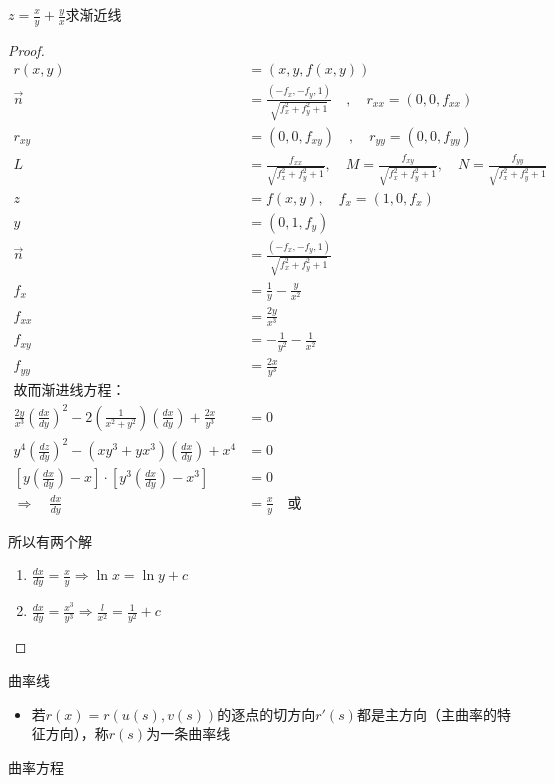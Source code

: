 \documentclass[lang=cn,10pt,thmcnt=section]{elegantbook}
\begin{document}
\begin{example}
    $z=\frac{x}{y}+\frac{y}{x}$求渐近线
\end{example}
\begin{proof}
    \begin{align*}
        r(x,y) &= (x, y, f(x,y)) \\
        \vec{n} &= \frac{(-f_x, -f_y, 1)}{\sqrt{f_x^2 + f_y^2 + 1}} \quad , \quad r_{xx} = (0, 0, f_{xx}) \\
        r_{xy} &= (0, 0, f_{xy}) \quad , \quad r_{yy} = (0, 0, f_{yy}) \\
        L &= \frac{f_{xx}}{\sqrt{f_x^2 + f_y^2 + 1}}, \quad M = \frac{f_{xy}}{\sqrt{f_x^2 + f_y^2 + 1}}, \quad N = \frac{f_{yy}}{\sqrt{f_x^2 + f_y^2 + 1}} \\   
        z &= f(x, y), \quad f_x = (1, 0, f_x) \\
        y &= (0, 1, f_y) \\
        \vec{n} &= \frac{(-f_x, -f_y, 1)}{\sqrt{f_x^2 + f_y^2 + 1}} \\
        f_x &= \frac{1}{y} - \frac{y}{x^2} \\
        f_{xx} &= \frac{2y}{x^3} \\
        f_{xy} &= -\frac{1}{y^2} - \frac{1}{x^2} \\
        f_{yy} &= \frac{2x}{y^3} \\ 
            \text{故而渐进线方程：} & \\
            \frac{2y}{x^3} \left( \frac{dx}{dy} \right)^2 
              - 2 \left( \frac{1}{x^2 + y^2} \right) \left( \frac{dx}{dy} \right) 
              + \frac{2x}{y^3} &= 0 \\
            y^4 \left( \frac{dz}{dy} \right)^2 
              - (xy^3 + yx^3) \left( \frac{dx}{dy} \right) 
              + x^4 &= 0 \\
            \left[ y \left( \frac{dx}{dy} \right) - x \right] 
              \cdot \left[ y^3 \left( \frac{dx}{dy} \right) - x^3 \right] &= 0 \\
            \Rightarrow \quad \frac{dx}{dy} &= \frac{x}{y} \quad \text{或} \quad 
            \end{align*}
            
            所以有两个解
            \begin{enumerate}
                \item $\frac{dx}{dy} = \frac{x}{y} \Rightarrow \ln x = \ln y + c $
                \item $\frac{dx}{dy} = \frac{x^3}{y^3}\Rightarrow \frac{l}{x^2} = \frac{1}{y^2} + c $
            \end{enumerate}     
\end{proof}
曲率线
\begin{itemize}
    \item 若$r(x)=r(u(s),v(s))$的逐点的切方向$r'(s)$都是主方向（主曲率的特征方向），称$r(s)$为一条曲率线
\end{itemize}
曲率方程 
\end{document}
